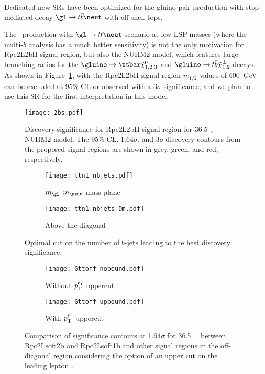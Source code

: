 Dedicated new SRs have been optimized for the gluino pair production with stop-mediated decay $\gl\to t\bar t\neut$ with off-shell tops.

The \glgl\ production with $\gl\to t\bar t\neut$ scenario at low LSP masses (where the multi-$b$ analysis has a much better sensitivity) is not the only motivation for Rpc2L2bH signal region, but also the NUHM2 model, which features large branching ratios for the $\gluino\to\ttbar\tilde{\chi}_{1,2,3}^0$ and $\gluino\to t\bar{b}\tilde{\chi}_{1,2}^\pm$ decays. As shown in Figure~\ref{fig:SR_nuhm}, with the Rpc2L2bH signal region $m_{1/2}$ values of 600~GeV can be excluded at 95\% CL or observed with a 3$\sigma$ significance, and we plan to use this SR for the first interpretation in this model.

\begin{figure}[t]
\centering
\texttt{[image: 2bs.pdf]}
\caption{Discovery significance for Rpc2L2bH signal region for 36.5~\ifb, NUHM2 model. The 95\% CL, 1.64$\sigma$, and 3$\sigma$ discovery contours from the proposed signal regions are shown in grey, green, and red, respectively.
}
\label{fig:SR_nuhm}
\end{figure}


\begin{figure}
\centering
\begin{subfigure}[t]{0.48\textwidth}
\caption{$m_{\gl}$-$m_{\neut}$ mass plane}
\texttt{[image: ttn1\_nbjets.pdf]}
\end{subfigure}
\begin{subfigure}[t]{0.48\textwidth}
\caption{Above the diagonal}
\texttt{[image: ttn1\_nbjets\_Dm.pdf]}
\end{subfigure}
\caption{Optimal cut on the number of $b$-jets leading to the best discovery significance.
}
\label{fig:SR_Gtt_bjets}
\end{figure}

\begin{figure}
\centering
\begin{subfigure}[t]{0.48\textwidth}
\caption{Without $p_{\rm T}^{\ell_1}$ uppercut}
\texttt{[image: Gttoff\_nobound.pdf]}
\end{subfigure}
\begin{subfigure}[t]{0.48\textwidth}
\caption{With $p_{\rm T}^{\ell_1}$ uppercut}
\texttt{[image: Gttoff\_upbound.pdf]}
\end{subfigure}
\caption{Comparison of significance contours at 1.64$\sigma$ for 36.5~\ifb~ between Rpc2Lsoft2b and Rpc2Lsoft1b and other signal regions in the off-diagonal region considering the option of an upper cut on the leading lepton \pt.}
\label{fig:SR_ptbound}
\end{figure}

